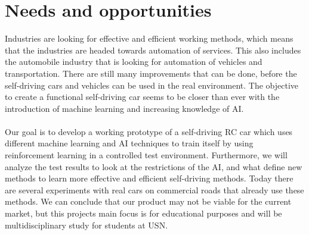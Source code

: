 \documentclass{article}
\begin{document}
\section{Needs and opportunities} 

\titleSpace
Industries are looking for effective and efficient working methods, which means that the industries are headed towards automation of services. This also includes the automobile industry that is looking for automation of vehicles and transportation. There are still many improvements that can be done, before the self-driving cars and vehicles can be used in the real environment. The objective to create a functional self-driving car seems to be closer than ever with the introduction of machine learning and increasing knowledge of AI.
\paragraph*{}
Our goal is to develop a working prototype of a self-driving RC car which uses different machine learning and AI techniques to train itself by using reinforcement learning in a controlled test environment. Furthermore, we will analyze the test results to look at the restrictions of the AI, and what define new methods to learn more effective and efficient self-driving methods. Today there are several experiments with real cars on commercial roads that already use these methods. 
We can conclude that our product may not be viable for the current market, but this projects main focus is for educational purposes and will be multidisciplinary study for students at USN.

  
\end{document}
